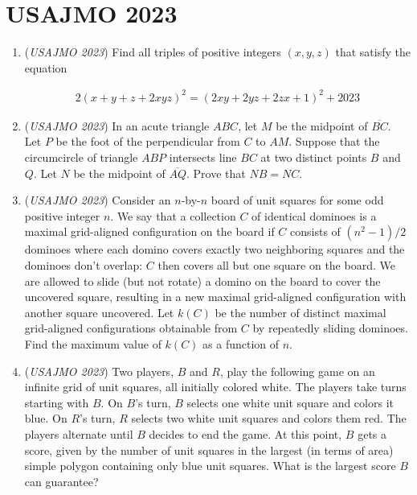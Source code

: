 \section{USAJMO 2023}
        \begin{enumerate}
        	\item (\textit{USAJMO 2023}) Find all triples of positive integers $(x,y,z)$ that satisfy the equation

 \begin{align*} 2(x+y+z+2xyz)^2=(2xy+2yz+2zx+1)^2+2023 \end{align*}



	\item (\textit{USAJMO 2023}) In an acute triangle $ABC$, let $M$ be the midpoint of $\overline{BC}$. Let $P$ be the foot of the perpendicular from $C$ to $AM$. Suppose that the circumcircle of triangle $ABP$ intersects line $BC$ at two distinct points $B$ and $Q$. Let $N$ be the midpoint of $\overline{AQ}$. Prove that $NB=NC$.


 

	\item (\textit{USAJMO 2023}) Consider an $n$-by-$n$ board of unit squares for some odd positive integer $n$. We say that a collection $C$ of identical dominoes is a maximal grid-aligned configuration on the board if $C$ consists of $(n^2-1)/2$ dominoes where each domino covers exactly two neighboring squares and the dominoes don't overlap: $C$ then covers all but one square on the board. We are allowed to slide (but not rotate) a domino on the board to cover the uncovered square, resulting in a new maximal grid-aligned configuration with another square uncovered. Let $k(C)$ be the number of distinct maximal grid-aligned configurations obtainable from $C$ by repeatedly sliding dominoes. Find the maximum value of $k(C)$ as a function of $n$.


 

	\item (\textit{USAJMO 2023}) Two players, $B$ and $R$, play the following game on an infinite grid of unit squares, all initially colored white. The players take turns starting with $B$. On $B$'s turn, $B$ selects one white unit square and colors it blue. On $R$'s turn, $R$ selects two white unit squares and colors them red. The players alternate until $B$ decides to end the game. At this point, $B$ gets a score, given by the number of unit squares in the largest (in terms of area) simple polygon containing only blue unit squares. What is the largest score $B$ can guarantee?



\end{enumerate}
